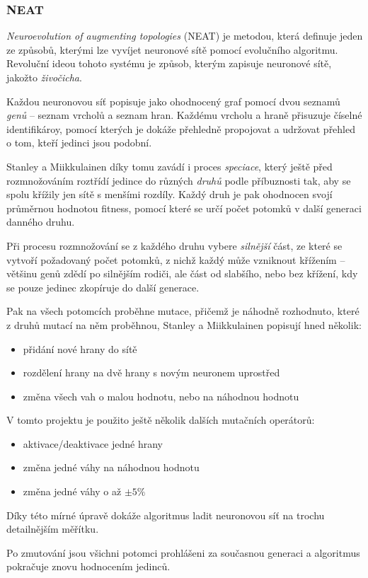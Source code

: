 \documentclass[a4]{article}
\begin{document}
\subsubsection{NEAT}
\emph{Neuroevolution of augmenting topologies}\cite{neat} (NEAT) je metodou, která definuje jeden ze způsobů, kterými lze vyvíjet neuronové sítě pomocí evolučního algoritmu. Revoluční ideou tohoto systému je způsob, kterým zapisuje neuronové sítě, jakožto \emph{živočicha}.\par
Každou neuronovou síť popisuje jako ohodnocený graf pomocí dvou seznamů \emph{genů} -- seznam vrcholů a seznam hran. Každému vrcholu a hraně přisuzuje číselné identifikároy, pomocí kterých je dokáže přehledně propojovat a udržovat přehled o tom, kteří jedinci jsou  podobní.\par
Stanley a Miikkulainen díky tomu zavádí i proces \emph{speciace}, který ještě před rozmnožováním roztřídí jedince do různých \emph{druhů} podle příbuznosti tak, aby se spolu křížily jen sítě s menšími rozdíly. Každý druh je pak ohodnocen svojí průměrnou hodnotou fitness, pomocí které se určí počet potomků v další generaci danného druhu.\par
Při procesu rozmnožování se z každého druhu vybere \emph{silnější} část, ze které se vytvoří požadovaný počet potomků, z nichž každý může vzniknout křížením -- většinu genů zdědí po silnějším rodiči, ale část od slabšího, nebo bez křížení, kdy se pouze jedinec zkopíruje do další generace.\par
Pak na všech potomcích proběhne mutace, přičemž je náhodně rozhodnuto, které z druhů mutací na něm proběhnou, Stanley a Miikkulainen popisují hned několik:
\begin{itemize}
\item{přidání nové hrany do sítě}
\item{rozdělení hrany na dvě hrany s novým neuronem uprostřed}
\item{změna všech vah o malou hodnotu, nebo na náhodnou hodnotu}
\end{itemize}
V tomto projektu je použito ještě několik dalších mutačních operátorů:
\begin{itemize}
\item{aktivace/deaktivace jedné hrany}
\item{změna jedné váhy na náhodnou hodnotu}
\item{změna jedné váhy o až $\pm 5\%$}
\end{itemize}
Díky této mírné úpravě dokáže algoritmus ladit neuronovou síť na trochu detailnějším měřítku.\par
Po zmutování jsou všichni potomci prohlášeni za současnou generaci a algoritmus pokračuje znovu hodnocením jedinců.
\end{document}
